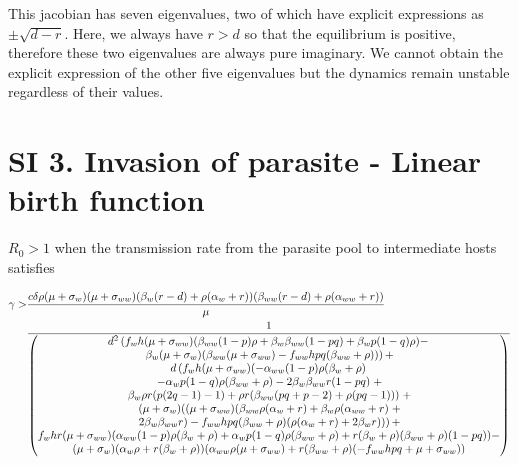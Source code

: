 \documentclass[11pt]{article}
\begin{document}
This jacobian has seven eigenvalues, two of which have explicit expressions as $\pm \sqrt{d - r}$. Here, we always have $r > d$ so that the equilibrium is positive, therefore these two eigenvalues are always pure imaginary. We cannot obtain the explicit expression of the other five eigenvalues but the dynamics remain unstable regardless of their values.

\section*{SI 3. Invasion of parasite - Linear birth function }


$R_0 > 1$ when the transmission rate from the parasite pool to intermediate hosts satisfies

\begin{align}
	\gamma > & \frac{c \delta  \rho  (\mu +\sigma_w) (\mu + \sigma_{ww}) (\beta_w (r-d)+\rho  (\alpha_w+ r)) (\beta_{ww} (r-d)+\rho  (\alpha_{ww}+r))}{\mu } \notag \\
	& \frac{1}{\begin{pmatrix}
			d^2 \left(f_w h (\mu  + \sigma_{ww}) (\beta_{ww} (1-p) \rho  + \beta_w \beta_{ww} (1-p q)+\beta_w p (1-q) \rho ) - \right. \\
			\left. \beta_w (\mu + \sigma_w) (\beta_{ww} (\mu +\sigma_{ww}) - f_{ww} h p q (\beta_{ww}+\rho ))\right) + \\
			d \left(f_w h (\mu +\sigma_{ww}) (- \alpha_{ww} (1-p) \rho  (\beta_w + \rho )  \right. \\
			\left. - \alpha_w p (1 - q) \rho  (\beta_{ww}+\rho ) - 2 \beta_w \beta_{ww} r (1-p q) \right. + \\
			\left. \beta_w \rho  r (p (2 q-1)-1) + \rho  r (\beta_{ww} (p q + p-2)+\rho  (p q - 1))) \right. + \\
			\left. (\mu +\sigma_w) ((\mu +\sigma_{ww}) (\beta_{ww} \rho  (\alpha_w+r) + \beta_w \rho  (\alpha_{ww}+r) \right. + \\
			\left. 2 \beta_w \beta_{ww} r)-f_{ww} h p q (\beta_{ww}+\rho ) (\rho  (\alpha_w+r)+2 \beta_w r)) \right) + \\
			f_w h r (\mu +\sigma_{ww}) (\alpha_{ww} (1-p) \rho  (\beta_w+\rho )+\alpha_w p (1-q) \rho  (\beta_{ww}+\rho )+r (\beta_w+\rho ) (\beta_{ww}+\rho ) (1-p q)) - \\
			(\mu +\sigma_w) (\alpha_w \rho +r (\beta_w+\rho )) (\alpha_{ww} \rho  (\mu +\sigma_{ww})+r (\beta_{ww}+\rho ) (-f_{ww} h p q+\mu +\sigma_{ww}))
		\end{pmatrix}}
\end{align}
\end{document}
